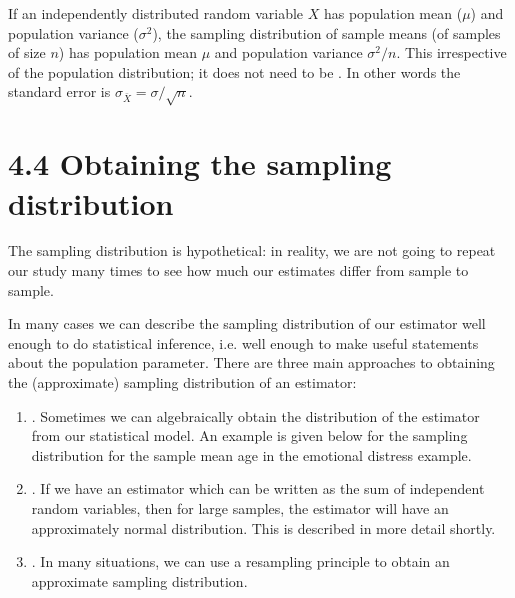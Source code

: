 \documentclass[letterpaper,10pt,english]{jupyterBook}
\begin{document}
\sphinxAtStartPar
If an independently distributed random variable \(X\) has population mean (\(\mu\)) and population variance (\(\sigma^2\)), the sampling distribution of sample means (of samples of size \(n\)) has population mean \(\mu\) and population variance \(\sigma^2/n\). This irrespective of the population distribution; it does not need to be . In other words the standard error is \(\sigma_{\bar{X}} = \sigma/\sqrt{n}\).




\section{4.4 Obtaining the sampling distribution}
\label{\detokenize{04.e. Population.and.samples:obtaining-the-sampling-distribution}}\label{\detokenize{04.e. Population.and.samples::doc}}
\sphinxAtStartPar
The sampling distribution is hypothetical: in reality, we are not going to repeat our study many times to see how much our estimates differ from sample to sample.

\sphinxAtStartPar
In many cases we can describe the sampling distribution of our estimator well enough to do statistical inference, i.e. well enough to make useful statements about the population parameter. There are three main approaches to obtaining the (approximate) sampling distribution of an estimator:
\begin{enumerate}
%
\item {} 
\sphinxAtStartPar
{}. Sometimes we can algebraically obtain the distribution of the estimator from our statistical model. An example is given below for the sampling distribution for the sample mean age in the emotional distress example.

\item {} 
\sphinxAtStartPar
{}. If we have an estimator which can be written as the sum of independent random variables, then for large samples, the estimator will have an approximately normal distribution. This is described in more detail shortly.

\item {} 
\sphinxAtStartPar
{}. In many situations, we can use a resampling principle to obtain an approximate sampling distribution.

\end{enumerate}
\end{document}
